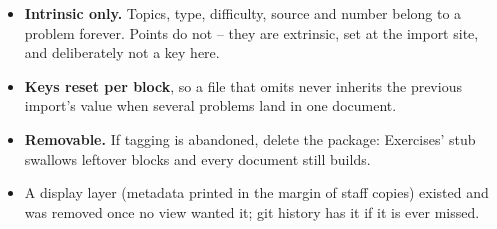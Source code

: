 \begin{itemize}
  \item \textbf{Intrinsic only.} Topics, type, difficulty, source and
    number belong to a problem forever. Points do not -- they are
    extrinsic, set at the import site, and deliberately not a key here.
  \item \textbf{Keys reset per block}, so a file that omits 
    never inherits the previous import's value when several problems land
    in one document.
  \item \textbf{Removable.} If tagging is abandoned, delete the package:
    Exercises'  stub swallows leftover blocks and every
    document still builds.
  \item A display layer (metadata printed in the margin of staff copies)
    existed and was removed once no view wanted it; git history has it if
    it is ever missed.
\end{itemize}
